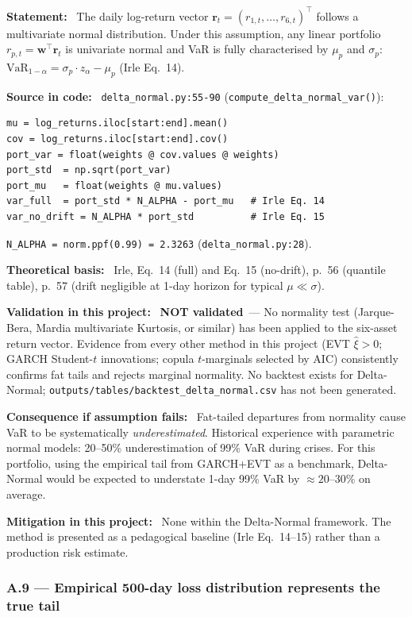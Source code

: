 \documentclass[11pt,a4paper]{article}
\newcommand{\asmfield}[1]{\medskip\noindent\textbf{#1:}\ }
\newcommand{\code}[1]{\texttt{#1}}
\newcommand{\notvalidated}{\textbf{NOT validated}}
\begin{document}
\asmfield{Statement}
The daily log-return vector $\mathbf{r}_t = (r_{1,t},\dots,r_{6,t})^\top$
follows a multivariate normal distribution. Under this assumption, any
linear portfolio $r_{p,t} = \mathbf{w}^\top \mathbf{r}_t$ is univariate
normal and VaR is fully characterised by $\mu_p$ and $\sigma_p$:
$\text{VaR}_{1-\alpha} = \sigma_p \cdot z_\alpha - \mu_p$ (Irle Eq.~14).

\asmfield{Source in code}
\code{delta\_normal.py:55-90} (\code{compute\_delta\_normal\_var()}):
\begin{lstlisting}
mu = log_returns.iloc[start:end].mean()
cov = log_returns.iloc[start:end].cov()
port_var = float(weights @ cov.values @ weights)
port_std  = np.sqrt(port_var)
port_mu   = float(weights @ mu.values)
var_full  = port_std * N_ALPHA - port_mu   # Irle Eq. 14
var_no_drift = N_ALPHA * port_std          # Irle Eq. 15
\end{lstlisting}
\code{N\_ALPHA = norm.ppf(0.99) = 2.3263} (\code{delta\_normal.py:28}).

\asmfield{Theoretical basis}
Irle, Eq.~14 (full) and Eq.~15 (no-drift), p.~56 (quantile table),
p.~57 (drift negligible at 1-day horizon for typical $\mu \ll \sigma$).

\asmfield{Validation in this project}
\notvalidated\ --- No normality test (Jarque-Bera, Mardia multivariate
Kurtosis, or similar) has been applied to the six-asset return vector.
Evidence from every other method in this project (EVT $\hat{\xi} > 0$;
GARCH Student-$t$ innovations; copula $t$-marginals selected by AIC)
consistently confirms fat tails and rejects marginal normality.
No backtest exists for Delta-Normal; \code{outputs/tables/backtest\_delta\_normal.csv}
has not been generated.

\asmfield{Consequence if assumption fails}
Fat-tailed departures from normality cause VaR to be systematically
\emph{underestimated}. Historical experience with parametric normal
models: 20--50\% underestimation of 99\% VaR during crises. For this
portfolio, using the empirical tail from GARCH+EVT as a benchmark,
Delta-Normal would be expected to understate 1-day 99\% VaR by
$\approx 20$--$30\%$ on average.

\asmfield{Mitigation in this project}
None within the Delta-Normal framework. The method is presented as a
pedagogical baseline (Irle Eq.~14--15) rather than a production risk
estimate.

\subsubsection{A.9 --- Empirical 500-day loss distribution represents the true tail}\label{asm:A9}
\end{document}
